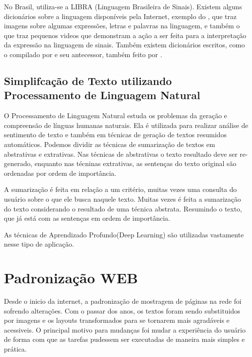 \documentclass[
	12pt,				%
	oneside,			%
	a4paper,			%
	english,			%
	brazil				%
	]{abntex2ppgsi}
\begin{document}
No Brasil, utiliza-se a LIBRA (Linguagem Brasileira de Sinais). Existem alguns dicionários sobre a linguagem disponíveis pela Internet, exemplo do , que traz imagens sobre algumas expressões, letras e palavras na linguagem, e também o  que traz pequenos videos que demonstram a ação a ser feita para a interpretação da expressão na linguagem de sinais. Também existem dicionários escritos, como o compilado por  e seu antecessor, também feito por .


\section{Simplifcação de Texto utilizando Processamento de Linguagem Natural} \label{nlp}

O Processamento de Linguagem Natural estuda os problemas da geração e compreensão de línguas humanas naturais. Ela é utilizada para realizar análise de sentimento de texto e também em técnicas de geração de textos resumidos automáticos. Podemos dividir as técnicas de sumarização de textos em abstrativas e extrativas. Nas técnicas de abstrativas o texto resultado deve ser re-generado, enquanto nas técninas extrativas, as sentenças do texto original são ordenadas por ordem de importância.

A sumarização é feita em relação a um critério, muitas vezes uma consulta do usuário sobre o que ele busca naquele texto.  Muitas vezes é feita a sumarização do texto considerando o resultado de uma técnica abstrata. Resumindo o texto, que já está com as sentenças em ordem de importância.

As técnicas de Aprendizado Profundo(Deep Learning) são utilizadas vastamente nesse tipo de aplicação. 


\chapter{Padronização WEB}

Desde o inicio da internet, a padronização de mostragem de páginas na rede foi sofrendo alterações. Com o passar dos anos, os textos foram sendo substituidos por imagens e os layouts transformados para se tornarem mais agradáveis e acessiveis. O principal motivo para mudanças foi mudar a experiência do usuário de forma com que as tarefas pudessem ser executadas de maneira mais simples e prática. 

 
\end{document}
